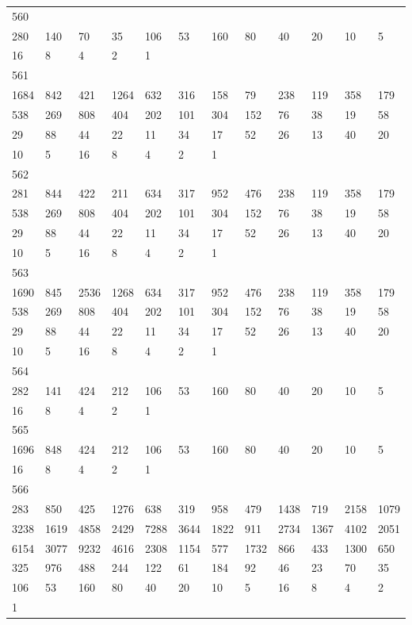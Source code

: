\begin{longtable}{llllllllllll}
560&&&&&&&&&&&\\
280& 140& 70& 35& 106& 53& 160& 80& 40& 20& 10& 5\\
16& 8& 4& 2& 1& \\

561&&&&&&&&&&&\\
1684& 842& 421& 1264& 632& 316& 158& 79& 238& 119& 358& 179\\
538& 269& 808& 404& 202& 101& 304& 152& 76& 38& 19& 58\\
29& 88& 44& 22& 11& 34& 17& 52& 26& 13& 40& 20\\
10& 5& 16& 8& 4& 2& 1& \\

562&&&&&&&&&&&\\
281& 844& 422& 211& 634& 317& 952& 476& 238& 119& 358& 179\\
538& 269& 808& 404& 202& 101& 304& 152& 76& 38& 19& 58\\
29& 88& 44& 22& 11& 34& 17& 52& 26& 13& 40& 20\\
10& 5& 16& 8& 4& 2& 1& \\

563&&&&&&&&&&&\\
1690& 845& 2536& 1268& 634& 317& 952& 476& 238& 119& 358& 179\\
538& 269& 808& 404& 202& 101& 304& 152& 76& 38& 19& 58\\
29& 88& 44& 22& 11& 34& 17& 52& 26& 13& 40& 20\\
10& 5& 16& 8& 4& 2& 1& \\

564&&&&&&&&&&&\\
282& 141& 424& 212& 106& 53& 160& 80& 40& 20& 10& 5\\
16& 8& 4& 2& 1& \\

565&&&&&&&&&&&\\
1696& 848& 424& 212& 106& 53& 160& 80& 40& 20& 10& 5\\
16& 8& 4& 2& 1& \\

566&&&&&&&&&&&\\
283& 850& 425& 1276& 638& 319& 958& 479& 1438& 719& 2158& 1079\\
3238& 1619& 4858& 2429& 7288& 3644& 1822& 911& 2734& 1367& 4102& 2051\\
6154& 3077& 9232& 4616& 2308& 1154& 577& 1732& 866& 433& 1300& 650\\
325& 976& 488& 244& 122& 61& 184& 92& 46& 23& 70& 35\\
106& 53& 160& 80& 40& 20& 10& 5& 16& 8& 4& 2\\
1& \\


\end{longtable}
